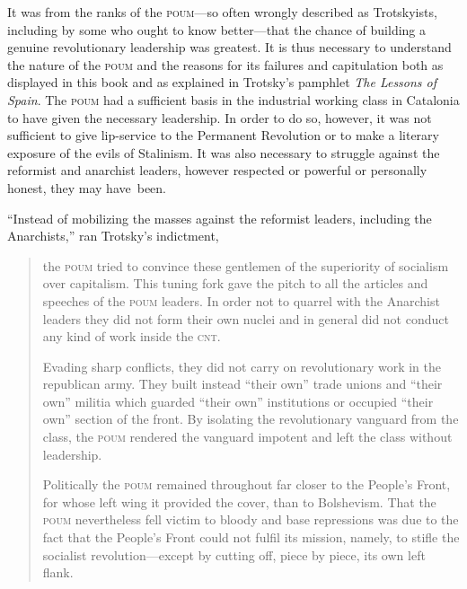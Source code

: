 It was from the ranks of the \textsc{poum}---so often wrongly described as Trotskyists, including by some who ought to know better---that the chance of building a genuine revolutionary leadership was greatest. It is thus necessary to understand the nature of the \textsc{poum} and the reasons for its failures and capitulation both as displayed in this book and as explained in Trotsky’s pamphlet \emph{The Lessons of Spain}. The \textsc{poum} had a sufficient basis in the industrial working class in Catalonia to have given the necessary leadership. In order to do so, however, it was not sufficient to give lip-service to the Permanent Revolution or to make a literary exposure of the evils of Stalinism. It was also necessary to struggle against the reformist and anarchist leaders, however respected or powerful or personally honest, they may have~been.

``Instead of mobilizing the masses against the reformist leaders, including the Anarchists,'' ran Trotsky’s indictment,

\begin{quotation}
  \noindent
  the \textsc{poum} tried to convince these gentlemen of the superiority of socialism over capitalism. This tuning fork gave the pitch to all the articles and speeches of the \textsc{poum} leaders. In order not to quarrel with the Anarchist leaders they did not form their own nuclei and in general did not conduct any kind of work inside the \textsc{cnt}.
  
  Evading sharp conflicts, they did not carry on revolutionary work in the republican army. They built instead ``their own'' trade unions and ``their own'' militia which guarded ``their own'' institutions or occupied ``their own'' section of the front. By isolating the revolutionary vanguard from the class, the \textsc{poum} rendered the vanguard impotent and left the class without leadership.
  
  Politically the \textsc{poum} remained throughout far closer to the People’s Front, for whose left wing it provided the cover, than to Bolshevism. That the \textsc{poum} nevertheless fell victim to bloody and base repressions was due to the fact that the People’s Front could not fulfil its mission, namely, to stifle the socialist revolution---except by cutting off, piece by piece, its own left flank.
\end{quotation}


